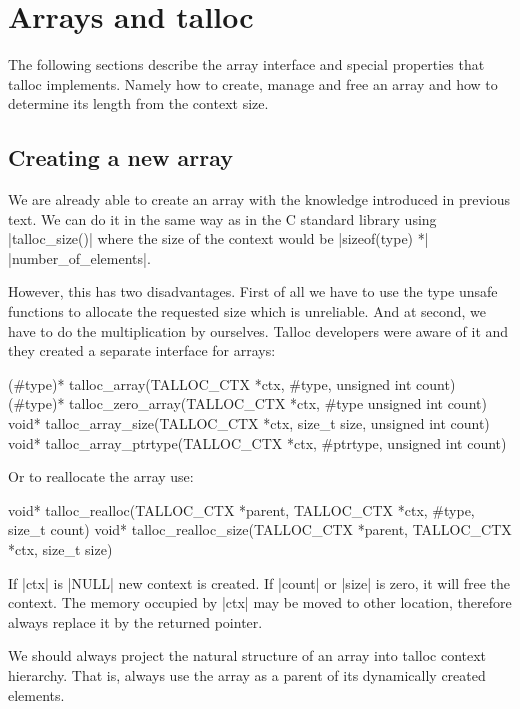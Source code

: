 \section{Arrays and talloc}
\label{talloc:sec:arrays}

The following sections describe the array interface and special properties that
talloc implements. Namely how to create, manage and free an array and how to
determine its length from the context size.

\subsection{Creating a new array}

We are already able to create an array with the knowledge introduced in
previous text. We can do it in the same way as in the C standard library using
|talloc_size()| where the size of the context would be |sizeof(type) *|
|number_of_elements|.

However, this has two disadvantages. First of all we have to use the type unsafe
functions to allocate the requested size which is unreliable. And at second,
we have to do the multiplication by ourselves. Talloc developers were aware of
it and they created a separate interface for arrays:

\begin{funcproto}
(#type)* talloc_array(TALLOC_CTX *ctx, #type,
                      unsigned int count)
(#type)* talloc_zero_array(TALLOC_CTX *ctx, #type
                           unsigned int count)
void* talloc_array_size(TALLOC_CTX *ctx, size_t size,
                        unsigned int count)
void* talloc_array_ptrtype(TALLOC_CTX *ctx, #ptrtype,
                           unsigned int count)
\end{funcproto}
\funclistend
Or to reallocate the array use:

\begin{funcproto}
void* talloc_realloc(TALLOC_CTX *parent,
                     TALLOC_CTX *ctx,
                     #type, size_t count)
void* talloc_realloc_size(TALLOC_CTX *parent,
                          TALLOC_CTX *ctx,
                          size_t size)
\end{funcproto}
\begin{funcdesc}
If |ctx| is |NULL| new context is created. If |count| or |size| is zero, it will
free the context. The memory occupied by |ctx| may be moved to other location,
therefore always replace it by the returned pointer.
\end{funcdesc}
\funclistend
We should always project the natural structure of an array into talloc context
hierarchy. That is, always use the array as a parent of its dynamically created
elements.

